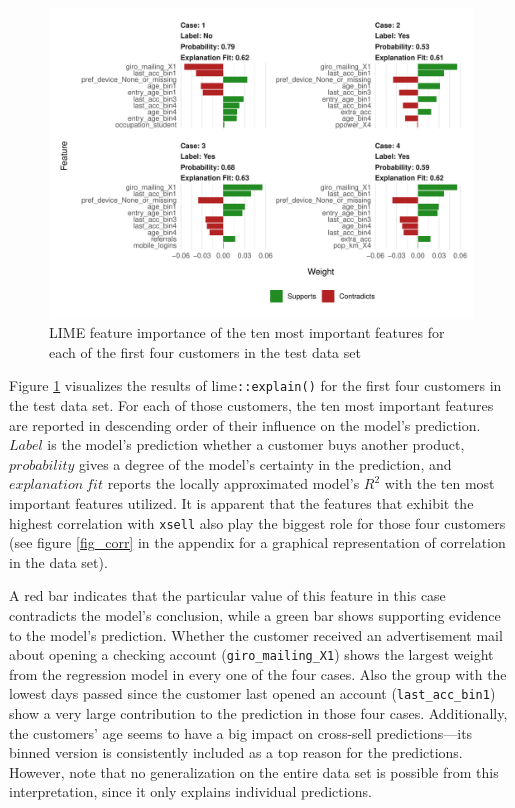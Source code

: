 \documentclass[12pt,a4paper]{article}
\newcommand{\pkg}[1]{{\normalfont\fontseries{b}\selectfont #1}}
\let\code=\texttt
\begin{document}
\begin{figure}[ht]
	\centering
  \includegraphics[scale=0.83]{figures/lime_first_four.pdf}
	\caption{LIME feature importance of the ten most important features for each of the first four customers in the test data set}
	\label{fig_lime_four}
\end{figure}

Figure \ref{fig_lime_four} visualizes the results of \pkg{lime}\code{::explain()} for the first four customers in the test data set.
For each of those customers, the ten most important features are reported in descending order of their influence on the model's prediction.
$Label$ is the model's prediction whether a customer buys another product, $probability$ gives a degree of the model's certainty in the prediction,
and $explanation\ fit$ reports the locally approximated model's $R^2$ with the ten most important features utilized.
It is apparent that the features that exhibit the highest correlation with \code{xsell} also play the biggest role for those four customers 
(see figure \ref{fig_corr} in the appendix for a graphical representation of correlation in the data set). 

A red bar indicates that the particular value of this feature in this case contradicts the model's conclusion,
while a green bar shows supporting evidence to the model's prediction.
Whether the customer received an advertisement mail about opening a checking account (\code{giro\_mailing\_X1}) shows the largest weight from the regression model in every one of the four cases.
Also the group with the lowest days passed since the customer last opened an account (\code{last\_acc\_bin1}) show a very large contribution to the 
prediction in those four cases.
Additionally, the customers' age seems to have a big impact on cross-sell predictions---its binned version is consistently included as a top reason for the predictions.
However, note that no generalization on the entire data set is possible from this interpretation, since it only explains individual predictions.
\end{document}

